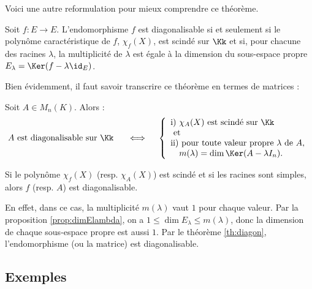 \documentclass[12pt, class=report,crop=false]{standalone}
\begin{document}
Voici une autre reformulation pour mieux comprendre ce théorème.

Soit $f : E \to E$. L'endomorphisme $f$ est diagonalisable si et seulement si le polynôme caractéristique de $f$, $\chi_f(X)$, est scindé sur $\Kk$ et si, pour 
chacune des racines $\lambda$, la multiplicité de $\lambda$ est égale 
  à la dimension du sous-espace propre $E_\lambda = \Ker(f-\lambda \id_E)$.
  
\bigskip

Bien évidemment, il faut savoir transcrire ce théorème en termes de matrices :
  
Soit $A \in M_n(K)$. Alors :
\[A \text{ est diagonalisable sur $\Kk$ } \quad\iff\quad \left\{\begin{array}{l}
\text{i) } \chi_A(X) \text{ est scindé sur $\Kk$}\\
\text{ et }\\
\text{ii) pour toute valeur propre $\lambda$ de $A$,} \\ \quad m(\lambda) = \dim \Ker(A-\lambda I_n).
\end{array}\right.\]

\begin{corollaire}
\label{cor:diagon}
Si le polynôme $\chi_f(X)$ (resp. $\chi_A(X)$) est scindé et si les racines sont simples, alors $f$ (resp. $A$) est diagonalisable.
\end{corollaire}

En effet, dans ce cas, la multiplicité $m(\lambda)$ vaut $1$ pour chaque valeur.
Par la proposition \ref{prop:dimElambda}, on a $1 \le \dim E_\lambda \le m(\lambda)$, donc la dimension de chaque sous-espace propre est aussi $1$. Par le théorème \ref{th:diagon}, l'endomorphisme (ou la matrice) est diagonalisable.


\subsection{Exemples}
\end{document}
